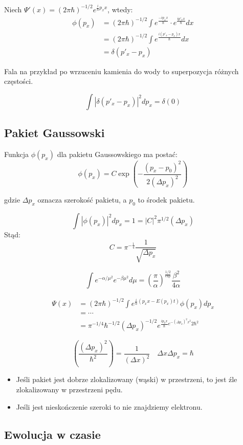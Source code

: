 Niech $\Psi'(x) = (2\pi\hbar)^{-1/2} e^{\frac{i}{\hbar} p_x x}$, wtedy:
\begin{align*}
\phi(p_x) &= (2\pi\hbar)^{-1/2} \int e^\frac{-ip_x x}{\hbar} \cdot e^\frac{ip'_x x}{\hbar} dx \\
&= (2\pi\hbar)^{-1/2} \int e^\frac{i(p'_x - p_x) x}{\hbar} dx \\
&= \delta(p'_x - p_x)
\end{align*}

Fala na przykład po wrzuceniu kamienia do wody to superpozycja różnych częstości.

\[
\int |\delta(p'_x - p_x)|^2 dp_x = \delta(0)
\]

\subsection{Pakiet Gaussowski}
Funkcja $\phi(p_x)$ dla pakietu Gaussowskiego ma postać:
\[
\phi(p_x) = C \exp \left( -\frac{(p_x - p_0)^2}{2 (\Delta p_x)^2} \right)
\]

gdzie $\Delta p_x$ oznacza szerokość pakietu, a $p_0$ to środek pakietu.

\[
\int |\phi(p_x)|^2 dp_x = 1 = |C|^2 \pi^{1/2} (\Delta p_x)
\]
Stąd:
\[
C = \pi^{-\frac{1}{4}} \frac{1}{\sqrt{\Delta p_x}}
\]

\[
\int e^{-\alpha/\mu^2} e^{-\beta \mu^2} d\mu = \left(\frac{\pi}{\alpha}\right)^\frac{1/2} \exp{\frac{\beta^2}{4\alpha}}
\]

\begin{align*}
\Psi(x) &= (2\pi\hbar)^{-1/2} \int e^{\frac{i}{\hbar} (p_x x - E(p_x) t)} \phi(p_x) dp_x \\
&= \cdots \\
&= \pi^{-1/4} \hbar^{-1/2} (\Delta p_x)^{-1/2} e^{\frac{ip_0 x}{\hbar} e^{-(\Delta p_x)^2 x^2}{2\hbar^2}}
\end{align*}

\[
(\frac{(\Delta p_x)^2}{\hbar^2}) = \frac{1}{(\Delta x)^2} \quad \Delta x \Delta p_x = \hbar
\]
\begin{itemize}
    \item Jeśli pakiet jest dobrze zlokalizowany (wąski) w przestrzeni, to jest źle zlokalizowany w przestrzeni pędu.
    \item Jeśli jest nieskończenie szeroki to nie znajdziemy elektronu.
\end{itemize}

\subsection{Ewolucja w czasie}

